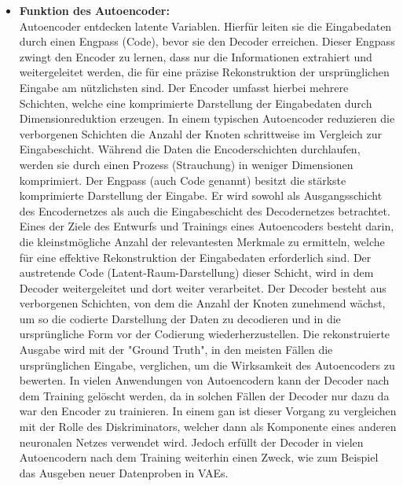\begin{itemize}
    \item \textbf{Funktion des Autoencoder:} \\
    Autoencoder entdecken latente Variablen. Hierfür leiten sie die Eingabedaten durch einen Engpass (Code), bevor sie den Decoder erreichen. Dieser Engpass zwingt den Encoder zu lernen, dass nur die Informationen extrahiert und weitergeleitet werden, die für eine präzise Rekonstruktion der ursprünglichen Eingabe am nützlichsten sind.\newline
    Der Encoder umfasst hierbei mehrere Schichten, welche eine komprimierte Darstellung der Eingabedaten durch Dimensionreduktion erzeugen. In einem typischen Autoencoder reduzieren die verborgenen Schichten die Anzahl der Knoten schrittweise im Vergleich zur Eingabeschicht. Während die Daten die Encoderschichten durchlaufen, werden sie durch einen Prozess (Strauchung) in weniger Dimensionen komprimiert.\newline
    Der Engpass (auch Code genannt) besitzt die stärkste komprimierte Darstellung der Eingabe. Er wird sowohl als Ausgangsschicht des Encodernetzes als auch die Eingabeschicht des Decodernetzes betrachtet. Eines der Ziele des Entwurfs und Trainings eines Autoencoders besteht darin, die kleinstmögliche Anzahl der relevantesten Merkmale zu ermitteln, welche für eine effektive Rekonstruktion der Eingabedaten erforderlich sind. Der austretende Code (Latent-Raum-Darstellung) dieser Schicht, wird in dem Decoder weitergeleitet und dort weiter verarbeitet.\newline
    Der Decoder besteht aus verborgenen Schichten, von dem die Anzahl der Knoten zunehmend wächst, um so die codierte Darstellung der Daten zu decodieren und in die ursprüngliche Form vor der Codierung wiederherzustellen. Die rekonstruierte Ausgabe wird mit der "Ground Truth", in den meisten Fällen die ursprünglichen Eingabe, verglichen, um die Wirksamkeit des Autoencoders zu bewerten.\newline
    In vielen Anwendungen von Autoencodern kann der Decoder nach dem Training gelöscht werden, da in solchen Fällen der Decoder nur dazu da war den Encoder zu trainieren. In einem \gls{gan} ist dieser Vorgang zu vergleichen mit der Rolle des Diskriminators, welcher dann als Komponente eines anderen neuronalen Netzes verwendet wird. Jedoch erfüllt der Decoder in vielen Autoencodern nach dem Training weiterhin einen Zweck, wie zum Beispiel das Ausgeben neuer Datenproben in \gls{VAE}s.\cite{ibmAutoencoder}
\end{itemize}

